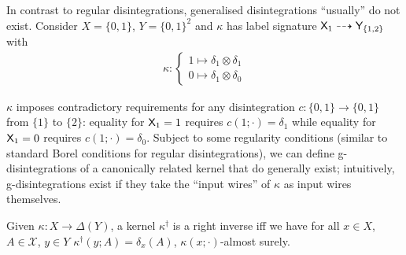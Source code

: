 
In contrast to regular disintegrations, generalised disintegrations ``usually'' do not exist. Consider $X=\{0,1\}$, $Y=\{0,1\}^2$ and $\kappa$ has label signature $\mathsf{X}_1\dashrightarrow \mathsf{Y}_{\{1,2\}}$ with
\begin{align}
	\kappa:\begin{cases} 1\mapsto \delta_1\otimes \delta_1\\
						 0\mapsto \delta_1\otimes \delta_0\end{cases}
\end{align}

$\kappa$ imposes contradictory requirements for any disintegration $c:\{0,1\}\to\{0,1\}$ from $\{1\}$ to $\{2\}$: equality for $\mathsf{X}_1=1$ requires $c(1;\cdot)=\delta_1$ while equality for $\mathsf{X}_1=0$ requires $c(1;\cdot) = \delta_0$. Subject to some regularity conditions (similar to standard Borel conditions for regular disintegrations), we can define g-disintegrations of a canonically related kernel that do generally exist; intuitively, g-disintegrations exist if they take the ``input wires'' of $\kappa$ as input wires themselves.

\begin{lemma}\label{lem:rightinverse}
Given $\kappa:X\to\Delta(Y)$, a kernel $\kappa^\dagger$ is a right inverse iff we have for all $x\in X$, $A\in \mathcal{X}$, $y\in Y$ $\kappa^\dagger(y;A)=\delta_x(A)$, $\kappa(x;\cdot)$-almost surely.
\end{lemma}

